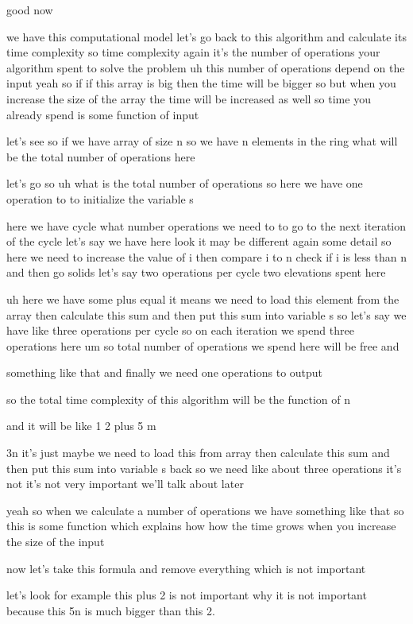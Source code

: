 good now

we have this computational model let's go back to this algorithm and calculate its time complexity so time complexity again it's the number of operations your algorithm spent to solve the problem uh this number of operations depend on the input yeah so if if this array is big then the time will be bigger so but when you increase the size of the array the time will be increased as well so time you already spend is some function of input

let's see so if we have array of size n so we have n elements in the ring what will be the total number of operations here

let's go so uh what is the total number of operations so here we have one operation to to initialize the variable s

here we have cycle what number operations we need to to go to the next iteration of the cycle let's say we have here look it may be different again some detail so here we need to increase the value of i then compare i to n check if i is less than n and then go solids let's say two operations per cycle two elevations spent here

uh here we have some plus equal it means we need to load this element from the array then calculate this sum and then put this sum into variable s so let's say we have like three operations per cycle so on each iteration we spend three operations here um so total number of operations we spend here will be free and

something like that and finally we need one operations to output

so the total time complexity of this algorithm will be the function of n

and it will be like 1 2 plus 5 m

3n it's just maybe we need to load this from array then calculate this sum and then put this sum into variable s back so we need like about three operations it's not it's not very important we'll talk about later

yeah so when we calculate a number of operations we have something like that so this is some function which explains how how the time grows when you increase the size of the input

now let's take this formula and remove everything which is not important

let's look for example this plus 2 is not important why it is not important because this 5n is much bigger than this 2.

